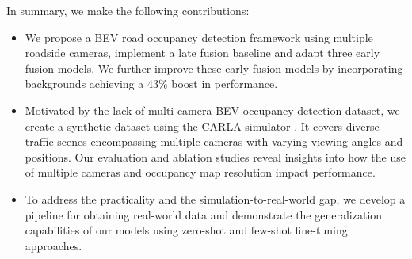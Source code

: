 
In summary, we make the following contributions:

\begin{itemize}
    \item We propose a BEV road occupancy detection framework using multiple roadside cameras, implement a late fusion baseline and adapt three early fusion models. We further improve these early fusion models by incorporating backgrounds achieving a 43\% boost in performance.
    
    \item Motivated by the lack of multi-camera BEV occupancy detection dataset, we create a synthetic dataset using the CARLA simulator \cite{dosovitskiy2017carla}. It covers diverse traffic scenes encompassing multiple cameras with varying viewing angles and positions. Our evaluation and ablation studies reveal insights into how the use of multiple cameras and occupancy map resolution impact performance.

    \item To address the practicality and the simulation-to-real-world gap, we develop a pipeline for obtaining real-world data and demonstrate the generalization capabilities of our models using zero-shot and few-shot fine-tuning approaches.
    
\end{itemize}



